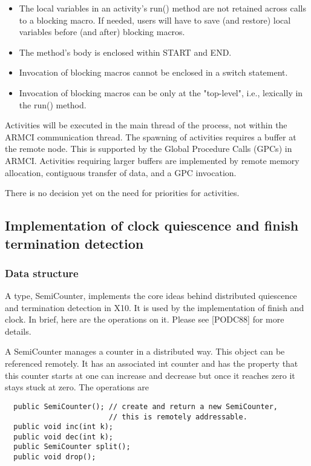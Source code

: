 \documentclass{article}
\begin{document}
\begin{itemize}
\item The local variables in an activity's run() method are not
  retained across calls to a blocking macro. If needed, users will
  have to save (and restore) local variables before (and after)
  blocking macros.  
\item The method's body is enclosed within START and END.  
\item Invocation of blocking macros cannot be enclosed in a switch
  statement. 
\item Invocation of blocking macros can be only at the "top-level",
  i.e., lexically in the run() method.
\end{itemize}

Activities will be executed in the main thread of the process, not
within the ARMCI communication thread. The spawning of activities
requires a buffer at the remote node. This is supported by the Global
Procedure Calls (GPCs) in ARMCI. Activities requiring larger buffers
are implemented by remote memory allocation, contiguous transfer of
data, and a GPC invocation.

There is no decision yet on the need for priorities for activities.

\subsection{Implementation of clock quiescence and finish termination
      detection}

\subsubsection{Data structure}

A type, SemiCounter, implements the core ideas behind distributed
quiescence and termination detection in X10. It is used by the
implementation of finish and clock. In brief, here are the operations
on it. Please see [PODC88] for more details.

A SemiCounter manages a counter in a distributed way. This object can
be referenced remotely. It has an associated int counter and has the
property that this counter starts at one can increase and decrease but
once it reaches zero it stays stuck at zero.  The operations are

\begin{verbatim}
  public SemiCounter(); // create and return a new SemiCounter, 
                        // this is remotely addressable.
  public void inc(int k);
  public void dec(int k);
  public SemiCounter split();
  public void drop();
\end{verbatim}
\end{document}
